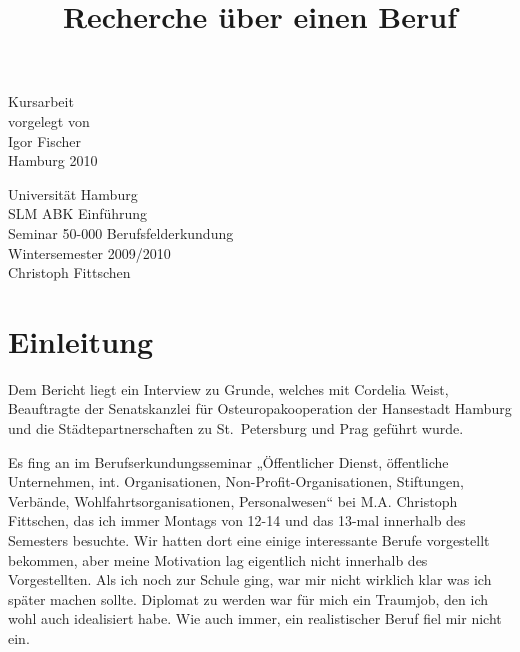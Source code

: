 \documentclass[12pt,headsepline,a4paper]{scrartcl}
\title{}
\author{}
\begin{document}
\begin{titlepage}
\date{}

\title{\Large Recherche über einen Beruf}
{\let\newpage\relax\maketitle}

\begin{center}
\vfill
Kursarbeit\\
vorgelegt von\\
Igor Fischer \\
\null
Hamburg 2010
\vfill
\end{center}
\begin{minipage}{0.5\textwidth}
\begin{flushleft} 
Universität Hamburg\\
SLM ABK Einführung\\
Seminar 50-000 Berufsfelderkundung\\
Wintersemester 2009/2010\\
Christoph Fittschen\\

\end{flushleft}
\end{minipage}
\vline
\begin{minipage}{0.5\textwidth}
\begin{flushright}
\end{flushright}

\end{minipage}

\end{titlepage}

\tableofcontents
\thispagestyle{empty}

\section{Einleitung}
Dem Bericht liegt ein Interview zu Grunde, welches mit Cordelia Weist, Beauftragte der Senatskanzlei für Osteuropakooperation der Hansestadt Hamburg und die Städtepartnerschaften zu St.\ Petersburg und Prag geführt wurde.

Es fing an im Berufserkundungsseminar „Öffentlicher Dienst, öffentliche Unternehmen, int. Organisationen, 
Non-Profit-Organisationen, Stiftungen, Verbände, Wohlfahrtsorganisationen, Personalwesen“ bei M.A. Christoph Fittschen, das ich immer Montags von 12-14 und das 13-mal innerhalb des Semesters besuchte. Wir hatten dort eine einige interessante Berufe vorgestellt bekommen, aber meine Motivation lag eigentlich nicht innerhalb des Vorgestellten.
Als ich noch zur Schule ging, war mir nicht wirklich klar was ich später machen sollte. Diplomat zu werden war für mich ein Traumjob, den ich wohl auch idealisiert habe. Wie auch immer, ein realistischer Beruf fiel mir nicht ein. 
\end{document}
